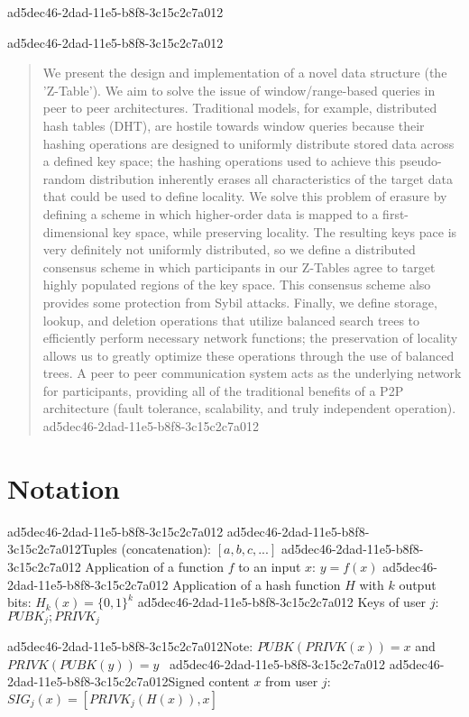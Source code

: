 \documentclass[12pt]{article}
\begin{document}
ad5dec46-2dad-11e5-b8f8-3c15c2c7a012
\maketitle

ad5dec46-2dad-11e5-b8f8-3c15c2c7a012\begin{abstract}
We present the design and implementation of a novel data structure (the 'Z-Table'). We aim to solve the issue of window/range-based queries in peer to peer architectures. Traditional models, for example,  distributed hash tables (DHT), are hostile towards window queries because their hashing operations are designed to uniformly distribute stored data across a defined key space; the hashing operations used to achieve this pseudo-random distribution inherently erases all characteristics of the target data that could be used to define locality. We solve this problem of erasure by defining a scheme in which higher-order data is mapped to a first-dimensional key space, while preserving locality. The resulting keys pace is very definitely not uniformly distributed, so we define a distributed consensus scheme in which participants in our Z-Tables agree to target highly populated regions of the key space. This consensus scheme also provides some protection from Sybil attacks. Finally, we define storage, lookup, and deletion operations that utilize balanced search trees to efficiently perform necessary network functions; the preservation of locality allows us to greatly optimize these operations through the use of balanced trees. A peer to peer communication system acts as the underlying network for participants, providing all of the traditional benefits of a P2P architecture (fault tolerance, scalability, and truly independent operation).
ad5dec46-2dad-11e5-b8f8-3c15c2c7a012\end{abstract}

\section{Notation}
ad5dec46-2dad-11e5-b8f8-3c15c2c7a012
ad5dec46-2dad-11e5-b8f8-3c15c2c7a012Tuples (concatenation): $[a,b,c,...]$
ad5dec46-2dad-11e5-b8f8-3c15c2c7a012
Application of a function $f$ to an input $x$: $y=f(x)$
ad5dec46-2dad-11e5-b8f8-3c15c2c7a012
Application of a hash function $H$ with $k$ output bits: $H_{k}(x) = \{0,1\}^k$
ad5dec46-2dad-11e5-b8f8-3c15c2c7a012
Keys of user $j$: $ PUBK_j; PRIVK_j $

ad5dec46-2dad-11e5-b8f8-3c15c2c7a012Note: $PUBK(PRIVK(x)) = x$ and $PRIVK(PUBK(y)) = y$~
ad5dec46-2dad-11e5-b8f8-3c15c2c7a012
ad5dec46-2dad-11e5-b8f8-3c15c2c7a012Signed content $x$ from user $j$: $SIG_j(x) = \left[ PRIVK_j( H(x) ), x \right]$
\end{document}
